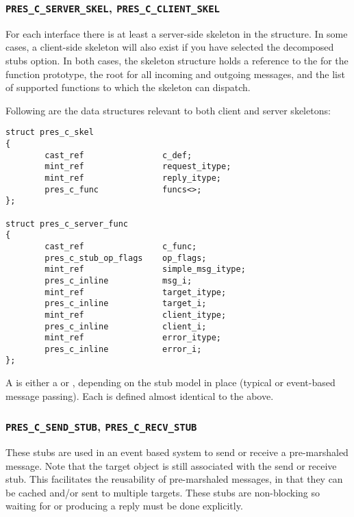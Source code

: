 \subsubsection{\texttt{PRES\_C\_SERVER\_SKEL},
               \texttt{PRES\_C\_CLIENT\_SKEL}}

For each interface there is at least a server-side skeleton in the \PRESC{}
structure.  In some cases, a client-side skeleton will also exist if you have
selected the decomposed stubs option.  In both cases, the skeleton structure
holds a reference to the \CAST{} for the function prototype, the root \MINT{}
for all incoming and outgoing messages, and the list of supported functions to
which the skeleton can dispatch.

Following are the data structures relevant to both client and server skeletons:

\begin{verbatim}
struct pres_c_skel
{
        cast_ref                c_def;
        mint_ref                request_itype;
        mint_ref                reply_itype;
        pres_c_func             funcs<>;
};

struct pres_c_server_func
{
        cast_ref                c_func;
        pres_c_stub_op_flags    op_flags;
        mint_ref                simple_msg_itype;
        pres_c_inline           msg_i;
        mint_ref                target_itype;
        pres_c_inline           target_i;
        mint_ref                client_itype;
        pres_c_inline           client_i;
        mint_ref                error_itype;
        pres_c_inline           error_i;
};
\end{verbatim}

A  is either a  or
, depending on the stub model in place (typical
\RPC{} or event-based message passing).  Each is defined almost identical to
the  above.

\subsubsection{\texttt{PRES\_C\_SEND\_STUB},
               \texttt{PRES\_C\_RECV\_STUB}}

These stubs are used in an event based system to send or receive a
pre-marshaled message.  Note that the target object is still associated with
the send or receive stub.  This facilitates the reusability of pre-marshaled
messages, in that they can be cached and/or sent to multiple targets.  These
stubs are non-blocking so waiting for or producing a reply must be done
explicitly.

